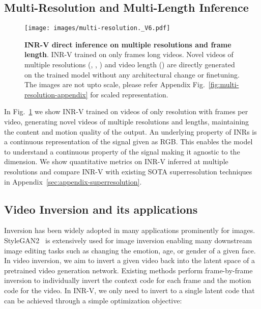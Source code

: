 \documentclass[10pt]{article} \usepackage[accepted]{tmlr}
\begin{document}
\subsection{Multi-Resolution and Multi-Length Inference}
\label{sec:multi-res-section}
\begin{figure}
  \centering
  \texttt{[image: images/multi-resolution.\_V6.pdf]}
  \caption{\textbf{INR-V direct inference on multiple resolutions and frame length}.  INR-V trained on only  frames long  videos. Novel videos of multiple resolutions (, , ) and video length () are directly generated on the trained model without any architectural change or finetuning. The images are not upto scale, please refer Appendix Fig.~\ref{fig:multi-resolution-appendix} for scaled representation.}
  \label{fig:multi-scale}
\end{figure}















In Fig.~\ref{fig:multi-scale} we show INR-V trained on videos of only  resolution with  frames per video, generating novel videos of multiple resolutions and lengths, maintaining the content and motion quality of the output. An underlying property of INRs is a continuous representation of the signal given as  RGB. This enables the model to understand a continuous property of the signal making it agnostic to the dimension. We show quantitative metrics on INR-V inferred at multiple resolutions and compare INR-V with existing SOTA superresolution techniques~\cite{videoinr} in Appendix~\ref{sec:appendix-superresolution}.  



\subsection{Video Inversion and its applications}
Inversion has been widely adopted in many applications prominently for images. StyleGAN2~\cite{stylegan2} is extensively used for image inversion enabling many downstream image editing tasks such as changing the emotion, age, or gender of a given face. 
In video inversion, we aim to invert a given video back into the latent space of  a pretrained video generation network. Existing methods perform frame-by-frame inversion to individually invert the context code for each frame and the motion code for the video. 
In INR-V, we only need to invert to a single latent code that can be achieved through a simple optimization objective:
\end{document}
